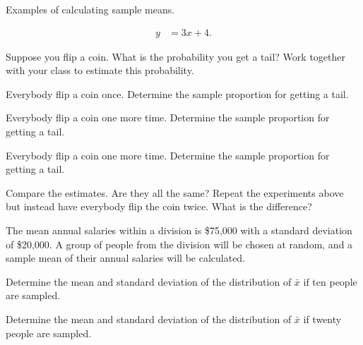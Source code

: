 

\begin{problem}
\item Examples of calculating sample means.

  \begin{subproblem}
  \item 
    \begin{eqnarray}
      y & = 3x + 4.
    \end{eqnarray}
    \vfill
  \end{subproblem}


\end{problem}



\begin{problem}
  \item Suppose you flip a coin. What is the probability you get a
    tail? Work together with your class to estimate this probability.
    \begin{subproblem}
    \item Everybody flip a coin once. Determine the sample proportion
      for getting a tail.
      \vfill
    \item Everybody flip a coin one more time. Determine the sample proportion
      for getting a tail.
      \vfill
    \item Everybody flip a coin one more time. Determine the sample proportion
      for getting a tail.
      \vfill
    \item Compare the estimates. Are they all the same? Repeat the
      experiments above but instead have everybody flip the coin
      twice. What is the difference?
      \vspace{3em}
    \end{subproblem}
    \clearpage

  \item The mean annual salaries within a division is \$75,000 with a
    standard deviation of \$20,000. A group of people from the
    division will be chosen at random, and a sample mean of their
    annual salaries will be calculated.
  \begin{subproblem}
    \item Determine the mean and standard deviation of the
      distribution of $\bar{x}$ if ten people are sampled.

      \vfill

    \item Determine the mean and standard deviation of the
      distribution of $\bar{x}$ if twenty  people are sampled.


\end{subproblem}
\end{problem}
